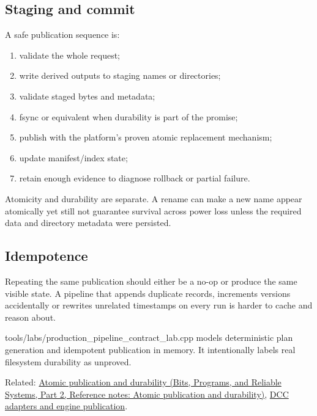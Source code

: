 \subsection{Staging and commit}\label{appendix-91eaa3cbdbc3-staging-and-commit}

\hypertarget{appendix-91eaa3cbdbc3-staging-and-commit}{}

A safe publication sequence is:

\begin{enumerate}
\def\labelenumi{\arabic{enumi}.}
\tightlist
\item
  validate the whole request;
\item
  write derived outputs to staging names or directories;
\item
  validate staged bytes and metadata;
\item
  fsync or equivalent when durability is part of the promise;
\item
  publish with the platform's proven atomic replacement mechanism;
\item
  update manifest/index state;
\item
  retain enough evidence to diagnose rollback or partial failure.
\end{enumerate}

Atomicity and durability are separate. A rename can make a new name appear atomically yet still not guarantee survival across power loss unless the required data and directory metadata were persisted.

\subsection{Idempotence}\label{appendix-91eaa3cbdbc3-idempotence}

\hypertarget{appendix-91eaa3cbdbc3-idempotence}{}

Repeating the same publication should either be a no-op or produce the same visible state. A pipeline that appends duplicate records, increments versions accidentally or rewrites unrelated timestamps on every run is harder to cache and reason about.

tools/labs/production\_pipeline\_contract\_lab.cpp models deterministic plan generation and idempotent publication in memory. It intentionally labels real filesystem durability as unproved.

Related: \href{../01-Bits-Programs-and-Reliable-Systems-P02/main.pdf\#appendix-e89a8f290ef5}{Atomic publication and durability (Bits, Programs, and Reliable Systems, Part 2, Reference notes: Atomic publication and durability)}, \hyperref[appendix-03ade9e1875f]{DCC adapters and engine publication}.
